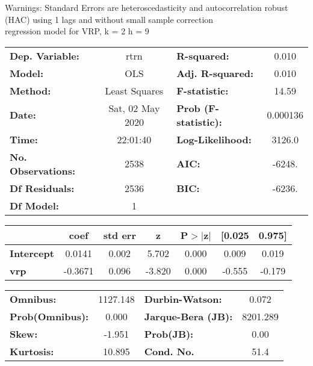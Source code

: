 Warnings: \newline
 [1] Standard Errors are heteroscedasticity and autocorrelation robust (HAC) using 1 lags and without small sample correction\\ 

regression model for VRP, k = 2 h = 9\begin{center}
\begin{tabular}{lclc}
\toprule
\textbf{Dep. Variable:}    &       rtrn       & \textbf{  R-squared:         } &     0.010   \\
\textbf{Model:}            &       OLS        & \textbf{  Adj. R-squared:    } &     0.010   \\
\textbf{Method:}           &  Least Squares   & \textbf{  F-statistic:       } &     14.59   \\
\textbf{Date:}             & Sat, 02 May 2020 & \textbf{  Prob (F-statistic):} &  0.000136   \\
\textbf{Time:}             &     22:01:40     & \textbf{  Log-Likelihood:    } &    3126.0   \\
\textbf{No. Observations:} &        2538      & \textbf{  AIC:               } &    -6248.   \\
\textbf{Df Residuals:}     &        2536      & \textbf{  BIC:               } &    -6236.   \\
\textbf{Df Model:}         &           1      & \textbf{                     } &             \\
\bottomrule
\end{tabular}
\begin{tabular}{lcccccc}
                   & \textbf{coef} & \textbf{std err} & \textbf{z} & \textbf{P$> |$z$|$} & \textbf{[0.025} & \textbf{0.975]}  \\
\midrule
\textbf{Intercept} &       0.0141  &        0.002     &     5.702  &         0.000        &        0.009    &        0.019     \\
\textbf{vrp}       &      -0.3671  &        0.096     &    -3.820  &         0.000        &       -0.555    &       -0.179     \\
\bottomrule
\end{tabular}
\begin{tabular}{lclc}
\textbf{Omnibus:}       & 1127.148 & \textbf{  Durbin-Watson:     } &    0.072  \\
\textbf{Prob(Omnibus):} &   0.000  & \textbf{  Jarque-Bera (JB):  } & 8201.289  \\
\textbf{Skew:}          &  -1.951  & \textbf{  Prob(JB):          } &     0.00  \\
\textbf{Kurtosis:}      &  10.895  & \textbf{  Cond. No.          } &     51.4  \\
\bottomrule
\end{tabular}
\end{center}

